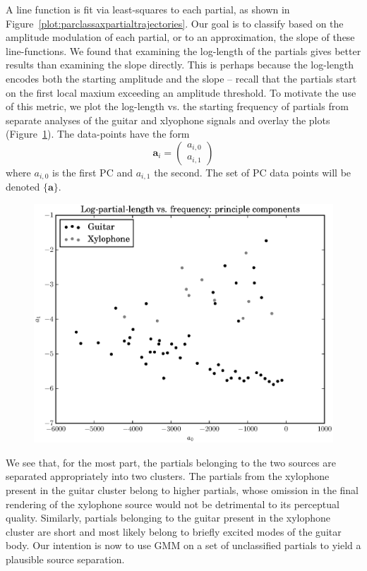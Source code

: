 \documentclass[letterpaper,12pt]{report}
\begin{document}
A line function is fit via least-squares to each partial, as shown in
Figure~\ref{plot:parclassaxpartialtrajectories}. Our goal is to classify based
on the amplitude modulation of each partial, or to an approximation, the slope of these line-functions. We found that examining the log-length of the
partials gives better results than examining the slope directly. This is perhaps
because the log-length encodes both the starting amplitude and the slope -- recall
that the partials start on the first local maxium exceeding an amplitude
threshold. To motivate the use of this metric, we plot the log-length vs. the
starting frequency of
partials from separate analyses of the guitar and xlyophone signals and overlay
the plots (Figure~\ref{plot:partialclassificationacgtrxyloseptruememberships}).
The data-points have the form
\[
    \boldsymbol{a}_i = \begin{pmatrix}
        a_{i,0} \\
        a_{i,1}
    \end{pmatrix}
\]
where $a_{i,0}$ is the first PC and $a_{i,1}$ the second. The set of PC data
points will be denoted $\{\boldsymbol{a}\}$.
\begin{figure}
    \includegraphics[width=\textwidth]{plots/partial_classification_acgtr_xylo_sep_true_memberships.eps}
    \caption{\label{plot:partialclassificationacgtrxyloseptruememberships}}
\end{figure}
We see that, for the most part, the partials belonging to the two sources are
separated appropriately into two clusters. The partials from the xylophone
present in the guitar cluster belong to higher partials, whose omission in the
final rendering of the xylophone source would not be detrimental to its
perceptual quality. Similarly, partials belonging to the guitar present in the
xylophone cluster are short and most likely belong to briefly excited modes
of the guitar body. Our intention is now to use GMM on a set of unclassified
partials to yield a plausible source separation.
\end{document}
